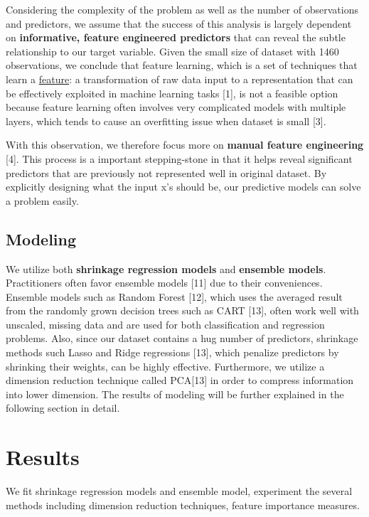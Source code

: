 \documentclass[a4paper]{article}
\begin{document}
\begin{flushleft}
Considering the complexity of the problem as well as the number of observations and predictors, we assume that the success of this analysis is largely dependent on \textbf{informative, feature engineered predictors} that can reveal the subtle relationship to our target variable. Given the small size of dataset with 1460 observations, we conclude that feature learning, which is a set of techniques that learn a \href{https://en.wikipedia.org/wiki/Feature_(machine_learning)}{feature}: a transformation of raw data input to a representation that can be effectively exploited in machine learning tasks [1], is not a feasible option because feature learning often involves very complicated models with multiple layers, which tends to cause an overfitting issue when dataset is small [3]. \newline

With this observation, we therefore focus more on \textbf{manual feature engineering} [4]. This process is a important stepping-stone in that it helps reveal significant predictors that are previously not represented well in original dataset. By explicitly designing what the input x's should be, our predictive models can solve a problem easily. \newline


\subsection{Modeling}
We utilize both \textbf{shrinkage regression models} and \textbf{ensemble models}. Practitioners often favor ensemble models [11] due to their conveniences. Ensemble models such as Random Forest [12], which uses the averaged result from the randomly grown decision trees such as CART [13], often work well with unscaled, missing data and are used for both classification and regression problems. Also, since our dataset contains a hug number of predictors, shrinkage methods such Lasso and Ridge regressions [13], which penalize predictors by shrinking their weights, can be highly effective. Furthermore, we utilize a dimension reduction technique called PCA[13] in order to compress information into lower dimension. The results of modeling will be further explained in the following section in detail.


\section{Results}

We fit shrinkage regression models and ensemble model, experiment the several methods including dimension reduction techniques, feature importance measures. \newline


\end{flushleft}
\end{document}

